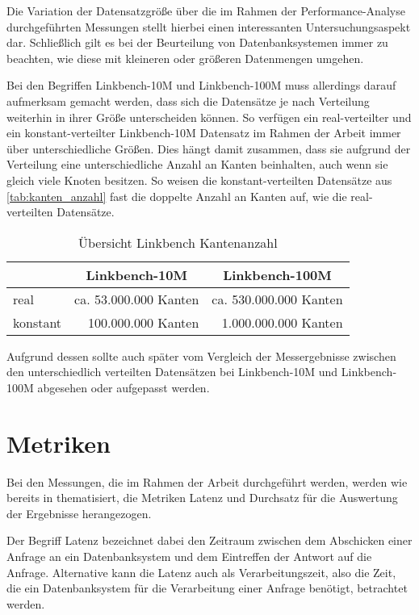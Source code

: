 Die Variation der Datensatzgröße über die im Rahmen der Performance-Analyse durchgeführten Messungen stellt hierbei einen interessanten Untersuchungsaspekt dar. Schließlich gilt es bei der Beurteilung von Datenbanksystemen immer zu beachten, wie diese mit kleineren oder größeren Datenmengen umgehen.

Bei den Begriffen Linkbench-10M und Linkbench-100M muss allerdings darauf aufmerksam gemacht werden, dass sich die Datensätze je nach Verteilung weiterhin in ihrer Größe unterscheiden können. So verfügen ein real-verteilter und ein konstant-verteilter Linkbench-10M Datensatz im Rahmen der Arbeit immer über unterschiedliche Größen. Dies hängt damit zusammen, dass sie aufgrund der Verteilung eine unterschiedliche Anzahl an Kanten beinhalten, auch wenn sie gleich viele Knoten besitzen. So weisen die konstant-verteilten Datensätze aus \autoref{tab:kanten_anzahl} fast die doppelte Anzahl an Kanten auf, wie die real-verteilten Datensätze. 

\begin{table}[ht]
    \centering
    \begin{tabular}{l|r|r}
    \hline
    \rowcolor[HTML]{EFEFEF} 
    \multicolumn{1}{c|}{\cellcolor[HTML]{EFEFEF}\textbf{Verteilung}} & \multicolumn{1}{c|}{\cellcolor[HTML]{EFEFEF}\textbf{Linkbench-10M}} & \multicolumn{1}{c}{\cellcolor[HTML]{EFEFEF}\textbf{Linkbench-100M}} \\ \hline
    real & ca. 53.000.000 Kanten & ca. 530.000.000 Kanten \\
    konstant & 100.000.000 Kanten & 1.000.000.000 Kanten \\ \hline
    \end{tabular}
    \caption{Übersicht Linkbench Kantenanzahl}
    \label{tab:kanten_anzahl}
\end{table}

Aufgrund dessen sollte auch später vom Vergleich der Messergebnisse zwischen den unterschiedlich verteilten Datensätzen bei Linkbench-10M und Linkbench-100M abgesehen oder aufgepasst werden.

\section{Metriken}
\label{analyse:metriken}
Bei den Messungen, die im Rahmen der Arbeit durchgeführt werden, werden wie bereits in \cite{sigmod_tian} thematisiert, die Metriken Latenz und Durchsatz für die Auswertung der Ergebnisse herangezogen. 

Der Begriff Latenz bezeichnet dabei den Zeitraum zwischen dem Abschicken einer Anfrage an ein Datenbanksystem und dem Eintreffen der Antwort auf die Anfrage. Alternative kann die Latenz auch als Verarbeitungszeit, also die Zeit, die ein Datenbanksystem für die Verarbeitung einer Anfrage benötigt, betrachtet werden. 

